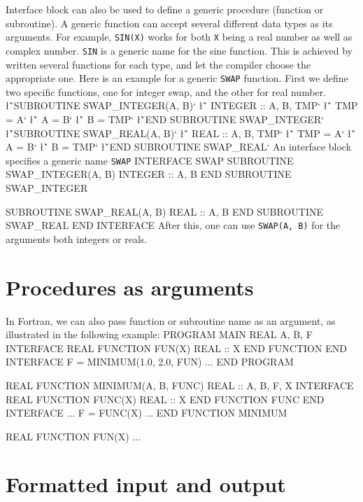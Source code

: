 {Interface block can also be used to define a generic procedure 
(function or subroutine).  A generic function can 
accept several different data types as its arguments.  For example, 
{\tt SIN(X)} works for both {\tt X} being a real number as well as
complex number. {\tt SIN} is a generic name for the sine function.
This is achieved by written several functions for each type, and let the
compiler choose the appropriate  one.  Here is an example for a generic
{\tt SWAP} function.  First we define two specific functions, one for
integer swap, and the other for real number.
\sms
\l{\v`SUBROUTINE SWAP_INTEGER(A, B)`}
\l{\v`   INTEGER :: A, B, TMP`\m{}}
\l{\v`   TMP = A`\m{}}
\l{\v`   A = B`\m{}}
\l{\v`   B = TMP`\m{}}
\l{\v`END SUBROUTINE SWAP_INTEGER`\m{}}
\sms
\sms
\l{\v`SUBROUTINE SWAP_REAL(A, B)`}
\l{\v`   REAL :: A, B, TMP`\m{}}
\l{\v`   TMP = A`\m{}}
\l{\v`   A = B`\m{}}
\l{\v`   B = TMP`\m{}}
\l{\v`END SUBROUTINE SWAP_REAL`\m{}}
\sms
An interface block specifies a generic name {\tt SWAP}
\ttbg
INTERFACE SWAP
   SUBROUTINE SWAP_INTEGER(A, B)
      INTEGER :: A, B
   END SUBROUTINE SWAP_INTEGER

   SUBROUTINE SWAP_REAL(A, B)
      REAL :: A, B
   END SUBROUTINE SWAP_REAL
END INTERFACE
\tted
After this, one can use {\tt SWAP(A, B)} for the arguments both integers
or reals.

\section{Procedures as arguments}
In Fortran, we can also pass function or subroutine name as an argument,
as illustrated in the following example:
\ttbg
PROGRAM MAIN
   REAL A, B, F
   INTERFACE
      REAL FUNCTION FUN(X)
         REAL :: X
      END FUNCTION
   END INTERFACE
   F = MINIMUM(1.0, 2.0, FUN)
   ...
END PROGRAM

REAL FUNCTION MINIMUM(A, B, FUNC)
   REAL :: A, B, F, X
   INTERFACE
      REAL FUNCTION FUNC(X)
         REAL :: X
      END FUNCTION FUNC
   END INTERFACE
   ...
   F = FUNC(X)
   ...
END FUNCTION MINIMUM

REAL FUNCTION FUN(X)
   ...
\tted


\section{Formatted input and output}

}
